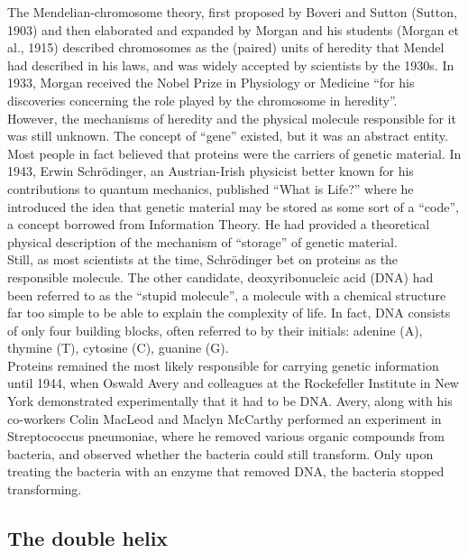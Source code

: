 The Mendelian-chromosome theory, first proposed by Boveri and Sutton (Sutton, 1903) and then elaborated and expanded by Morgan and his students (Morgan et al., 1915) described chromosomes as the (paired) units of heredity that Mendel had described in his laws, and was widely accepted by scientists by the 1930s. 
In 1933, Morgan received the Nobel Prize in Physiology or Medicine “for his discoveries concerning the role played by the chromosome in heredity”.\\

However, the mechanisms of heredity and the physical molecule responsible for it was still unknown. 
The concept of “gene” existed, but it was an abstract entity. 
Most people in fact believed that proteins were the carriers of genetic material. 
In 1943, Erwin  Schrödinger, an Austrian-Irish physicist better known for his contributions to quantum mechanics, published “What is Life?” where he introduced the idea that genetic material may be stored as some sort of a “code”, a concept borrowed from Information Theory. 
He had provided a theoretical physical description of the mechanism of “storage” of genetic material.\\ 

Still, as most scientists at the time, Schrödinger bet on proteins as the responsible molecule. 
The other candidate, deoxyribonucleic acid (DNA) had been referred to as the “stupid molecule”, a molecule with a chemical structure far too simple to be able to explain the complexity of life. 
In fact, DNA consists of only four building blocks, often referred to by their initials: adenine (A), thymine (T), cytosine (C), guanine (G).\\

Proteins remained the most likely responsible for carrying genetic information until 1944, when Oswald Avery and colleagues at the Rockefeller Institute in New York demonstrated experimentally that it had to be DNA. 
Avery, along with his co-workers Colin MacLeod and Maclyn McCarthy performed an experiment in Streptococcus pneumoniae, where he removed various organic compounds from bacteria, and observed whether the bacteria could still transform. 
Only upon treating the bacteria with an enzyme that removed DNA, the bacteria stopped transforming.

\subsection{The double helix} %

